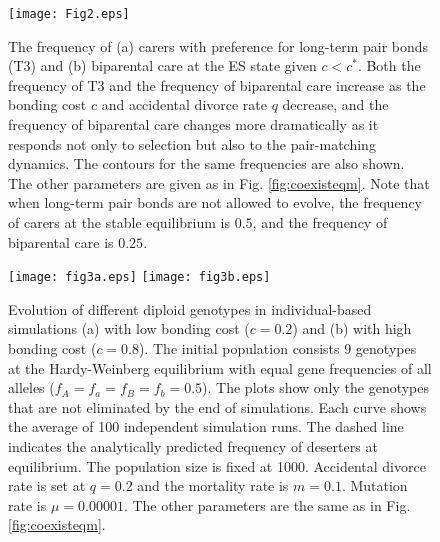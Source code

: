 \documentclass[12pt]{article}
\begin{document}
\clearpage
\begin{figure}
\centering
	\texttt{[image: Fig2.eps]}
	\caption{The frequency of (a) carers with preference for long-term pair bonds (T3) and (b) biparental care at the ES state given $c<c^*$. Both the frequency of T3 and the frequency of biparental care increase as the bonding cost $c$ and accidental divorce rate $q$ decrease, and the frequency of biparental care changes more dramatically as it responds not only to selection but also to the pair-matching dynamics. The contours for the same frequencies are also shown. The other parameters are given as in Fig. \ref{fig:coexisteqm}. Note that when long-term pair bonds are not allowed to evolve, the frequency of carers at the stable equilibrium is $0.5$, and the frequency of biparental care is $0.25$.}
	\label{fig:contour}
\end{figure}

\clearpage
\begin{figure}
\centering
	\texttt{[image: fig3a.eps]}
	\texttt{[image: fig3b.eps]}
\caption{Evolution of different diploid genotypes in individual-based simulations (a) with low bonding cost ($c=0.2$) and (b) with high bonding cost ($c=0.8$). The initial population consists 9 genotypes at the Hardy-Weinberg equilibrium with equal gene frequencies of all alleles ($f_A=f_a=f_B=f_b=0.5$). The plots show only the genotypes that are not eliminated by the end of simulations. Each curve shows the average of 100 independent simulation runs. The dashed line indicates the analytically predicted frequency of deserters at equilibrium. The population size is fixed at 1000. Accidental divorce rate is set at $q=0.2$ and the mortality rate is $m=0.1$. Mutation rate is $\mu=0.00001$. The other parameters are the same as in Fig. \ref{fig:coexisteqm}.}
\label{fig:Simulation}
\end{figure}
\end{document}
